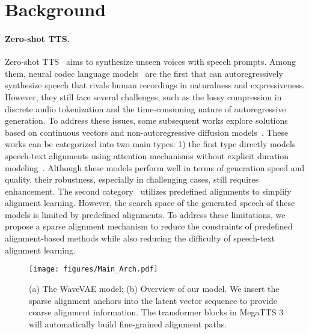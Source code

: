 \section{Background}

\paragraph{Zero-shot TTS.} 
Zero-shot TTS~\citep{casanova2022yourtts,wang2023neural,zhang2023speak,shen2023naturalspeech,le2023Voicebox,jiang2024mega,liu2024autoregressive,lee2024ditto,li2024styletts,lee2023hierspeech++,ju2024naturalspeech,meng2024autoregressive,chen2024f5} aims to synthesize unseen voices with speech prompts. Among them, neural codec language models~\citep{chen2024vall} are the first that can autoregressively synthesize speech that rivals human recordings in naturalness and expressiveness. However, they still face several challenges, such as the lossy compression in discrete audio tokenization and the time-consuming nature of autoregressive generation. To address these issues, some subsequent works explore solutions based on continuous vectors and non-autoregressive diffusion models~\citep{shen2023naturalspeech,le2023Voicebox,lee2024ditto,eskimez2024e2,yang2024simplespeech,yang2024simplespeech2,chen2024f5}. These works can be categorized into two main types: 1) the first type directly models speech-text alignments using attention mechanisms without explicit duration modeling~\citep{lee2024ditto,eskimez2024e2}. Although these models perform well in terms of generation speed and quality, their robustness, especially in challenging cases, still requires enhancement. The second category~\citep{shen2023naturalspeech,le2023Voicebox} utilizes predefined alignments to simplify alignment learning. However, the search space of the generated speech of these models is limited by predefined alignments. To address these limitations, we propose a sparse alignment mechanism to reduce the constraints of predefined alignment-based methods while also reducing the difficulty of speech-text alignment learning.

\begin{figure*}[!t]
	\centering
	\texttt{[image: figures/Main\_Arch.pdf]}
	\caption{(a) The WaveVAE model; (b) Overview of our model. We insert the sparse alignment anchors into the latent vector sequence to provide coarse alignment information. The transformer blocks in MegaTTS 3 will automatically build fine-grained alignment paths.}
	\label{fig:arch_overview}
\end{figure*}

